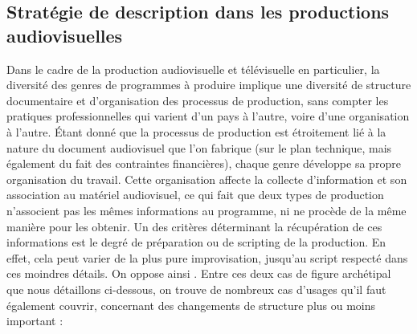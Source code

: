 \subsection{Stratégie de description dans les productions audiovisuelles}\label{sec:strat-desc}
Dans le cadre de la production audiovisuelle et télévisuelle en particulier, la diversité des genres de programmes à produire implique une diversité de structure documentaire et d'organisation des processus de production, sans compter les pratiques professionnelles qui varient d'un pays à l'autre, voire d'une organisation à l'autre. 
Étant donné que la processus de production est étroitement lié à la nature du document audiovisuel que l'on fabrique (sur le plan technique, mais également du fait des contraintes financières), chaque genre développe sa propre organisation du travail.
Cette organisation affecte la collecte d'information et son association au matériel audiovisuel, ce qui fait que deux types de production n'associent pas les mêmes informations au programme, ni ne procède de la même manière pour les obtenir.
Un des critères déterminant la récupération de ces informations est le degré de préparation ou de scripting de la production.
En effet, cela peut varier de la plus pure improvisation, jusqu'au script respecté dans ces moindres détails. On oppose ainsi .
Entre ces deux cas de figure archétipal que nous détaillons ci-dessous, on trouve de nombreux cas d'usages qu'il faut également couvrir, concernant des changements de structure plus ou moins important : 

